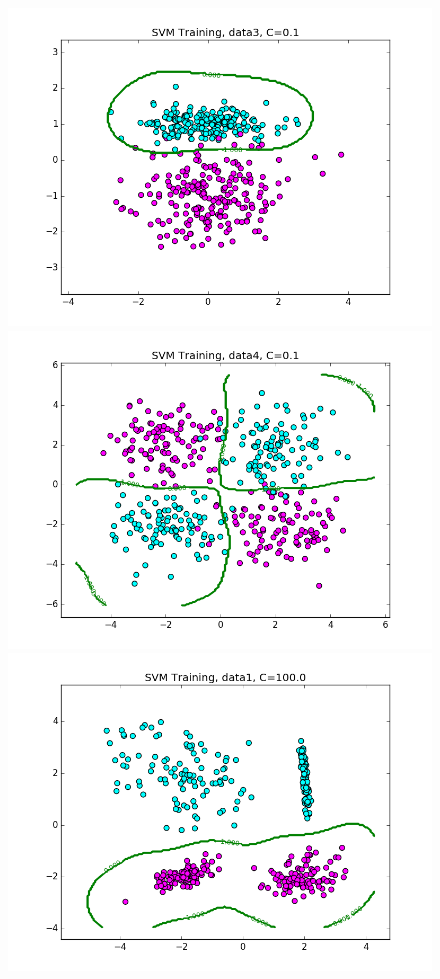 \documentclass{article}
\begin{document}
\begin{figure}[width=\linewidth]
\begin{multicols}{2}
  \includegraphics[width=1.2\linewidth]{code/P2/rbf_training,C=01,data3.png}
  \includegraphics[width=1.2\linewidth]{code/P2/rbf_training,C=01,data4.png}
  \includegraphics[width=1.2\linewidth]{code/P2/rbf_training,C=100,data1.png}

\end{multicols}
\end{figure}
\end{document}
